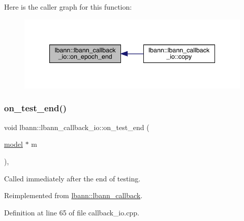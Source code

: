 Here is the caller graph for this function\+:\nopagebreak
\begin{figure}[H]
\begin{center}
\leavevmode
\includegraphics[width=340pt]{classlbann_1_1lbann__callback__io_a118c5cb8a9c83661a67569df890676e2_icgraph}
\end{center}
\end{figure}
\mbox{\label{classlbann_1_1lbann__callback__io_a8abca84e4b0dc21b28e5d5e409446fdc}} 
\subsubsection{\texorpdfstring{on\+\_\+test\+\_\+end()}{on\_test\_end()}}
{\footnotesize\ttfamily void lbann\+::lbann\+\_\+callback\+\_\+io\+::on\+\_\+test\+\_\+end (\begin{DoxyParamCaption}\item[{\hyperlink{classlbann_1_1model}{model} $\ast$}]{m }\end{DoxyParamCaption})\hspace{0.3cm}{\ttfamily [override]}, {\ttfamily [virtual]}}

Called immediately after the end of testing. 

Reimplemented from \hyperlink{classlbann_1_1lbann__callback_accbad4dd004c1ced33642db6398b2efe}{lbann\+::lbann\+\_\+callback}.



Definition at line 65 of file callback\+\_\+io.\+cpp.


